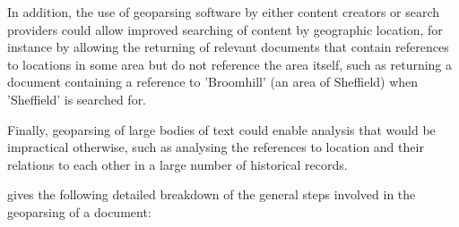 \documentclass[12pt, a4paper]{report}
\begin{document}
In addition, the use of geoparsing software by either content creators or search providers could allow improved searching of content by geographic location, for instance by allowing the returning of relevant documents that contain references to locations in some area but do not reference the area itself, such as returning a document containing a reference to 'Broomhill' (an area of Sheffield) when 'Sheffield' is searched for.

Finally, geoparsing of large bodies of text could enable analysis that would be impractical otherwise, such as analysing the references to location and their relations to each other in a large number of historical records.

\citet{hill2006} gives the following detailed breakdown of the general steps involved in the geoparsing of a document:
\end{document}
